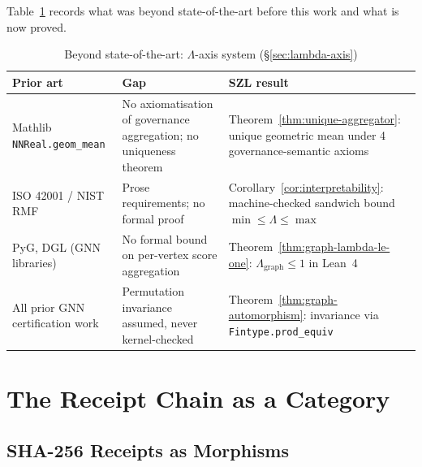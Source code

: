 \bsota
\label{bsota:lambda-axis}

\noindent
Table~\ref{tab:bsota-lambda} records what was beyond state-of-the-art
before this work and what is now proved.

\begin{table}[h!]
\centering\small
\caption{Beyond state-of-the-art: $\Lambda$-axis system (\S\ref{sec:lambda-axis})}
\label{tab:bsota-lambda}
\begin{tabular}{p{3.8cm}p{3.8cm}p{4.8cm}}
\hline
\textbf{Prior art} & \textbf{Gap} & \textbf{SZL result} \\
\hline
Mathlib \texttt{NNReal.geom\_mean} & No axiomatisation of governance aggregation; no uniqueness theorem & Theorem~\ref{thm:unique-aggregator}: unique geometric mean under 4 governance-semantic axioms \\
ISO 42001 / NIST RMF & Prose requirements; no formal proof & Corollary~\ref{cor:interpretability}: machine-checked sandwich bound $\min \le \Lambda \le \max$ \\
PyG, DGL (GNN libraries) & No formal bound on per-vertex score aggregation & Theorem~\ref{thm:graph-lambda-le-one}: $\Lambda_{\mathrm{graph}} \le 1$ in Lean~4 \\
All prior GNN certification work & Permutation invariance assumed, never kernel-checked & Theorem~\ref{thm:graph-automorphism}: invariance via \texttt{Fintype.prod\_equiv} \\
\hline
\end{tabular}
\end{table}

\section{The Receipt Chain as a Category}
\label{sec:receipt-chain}

\subsection{SHA-256 Receipts as Morphisms}
\label{subsec:receipts-morphisms}

